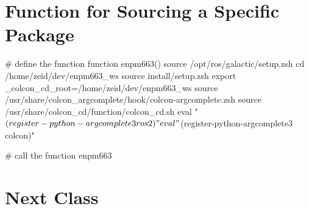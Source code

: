 \documentclass[usenames,11,dvipsnames,svgnames,x11names,aspectratio=1610,bibref]{beamer}
\newcommand{\iconColor}[1]{\textcolor{iconColor}{#1}}
\newcommand{\iconWarningColor}[1]{\textcolor{iconWarningColor}{#1}}
\newcommand\doublerulefill{\leavevmode\leaders\vbox{\hrule width .1pt\kern1pt\hrule}\hfill\kern0pt }
\renewcommand\sec{{\cnordSix{\secname}\hfill\mydisclaimer} }
\newcommand{\mywarning}{\iconWarningColor{\faExclamationTriangle}\xspace}
\newcommand{\myinfo}{\iconColor{\faInfoCircle}\xspace}
\begin{document}

\section{Function for Sourcing a Specific Package}
\begin{frame}[fragile]{\sec}
\vspace*{\fill}
\begin{center} 

\begin{bashScriptList}
# define the function
function enpm663(){
  source /opt/ros/galactic/setup.zsh
  cd /home/zeid/dev/enpm663_ws
  source install/setup.zsh
  export _colcon_cd_root=/home/zeid/dev/enpm663_ws
  source /usr/share/colcon_argcomplete/hook/colcon-argcomplete.zsh
  source /usr/share/colcon_cd/function/colcon_cd.sh
  eval "$(register-python-argcomplete3 ros2)"
  eval "$(register-python-argcomplete3 colcon)"
}

# call the function
enpm663
\end{bashScriptList}

\end{center}
\vspace*{\fill}
\end{frame}




\section{Next Class}
\end{document}
